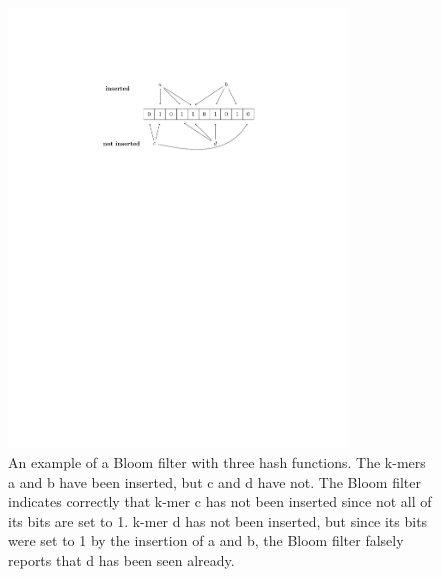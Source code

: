 \documentclass[11pt]{article}
\begin{document}
\begin{figure}[ht!]
\centering
\includegraphics[width=90mm]{bloom.pdf}
\caption{\tiny{An example of a Bloom filter with three hash functions. The k-mers a and b have been inserted, but c and d have not. The Bloom filter indicates correctly that k-mer c has not been inserted since not all of its bits are set to 1. k-mer d has not been inserted, but since its bits were set to 1 by the insertion of a and b, the Bloom filter falsely reports that d has been seen already.}}
\label{overflow}
\end{figure}
\end{document}
